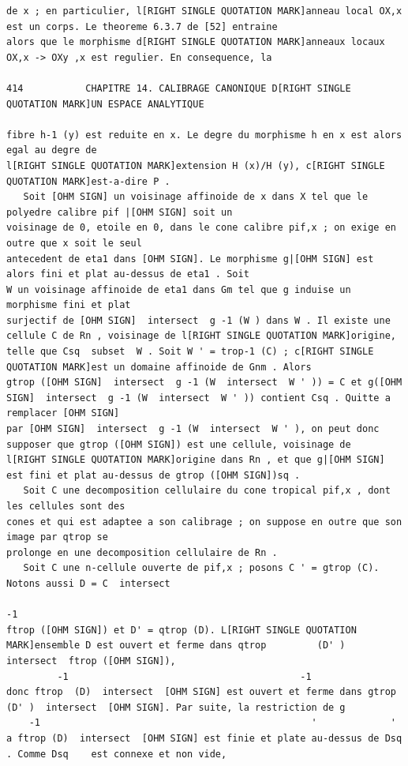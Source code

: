 \documentclass[
  11pt,
]{article}
\begin{document}
\begin{lstlisting}
de x ; en particulier, l[RIGHT SINGLE QUOTATION MARK]anneau local OX,x est un corps. Le theoreme 6.3.7 de [52] entraine
alors que le morphisme d[RIGHT SINGLE QUOTATION MARK]anneaux locaux OX,x -> OXy ,x est regulier. En consequence, la

414           CHAPITRE 14. CALIBRAGE CANONIQUE D[RIGHT SINGLE QUOTATION MARK]UN ESPACE ANALYTIQUE

fibre h-1 (y) est reduite en x. Le degre du morphisme h en x est alors egal au degre de
l[RIGHT SINGLE QUOTATION MARK]extension H (x)/H (y), c[RIGHT SINGLE QUOTATION MARK]est-a-dire P .
   Soit [OHM SIGN] un voisinage affinoide de x dans X tel que le polyedre calibre pif |[OHM SIGN] soit un
voisinage de 0, etoile en 0, dans le cone calibre pif,x ; on exige en outre que x soit le seul
antecedent de eta1 dans [OHM SIGN]. Le morphisme g|[OHM SIGN] est alors fini et plat au-dessus de eta1 . Soit
W un voisinage affinoide de eta1 dans Gm tel que g induise un morphisme fini et plat
surjectif de [OHM SIGN]  intersect  g -1 (W ) dans W . Il existe une cellule C de Rn , voisinage de l[RIGHT SINGLE QUOTATION MARK]origine,
telle que Csq  subset  W . Soit W ' = trop-1 (C) ; c[RIGHT SINGLE QUOTATION MARK]est un domaine affinoide de Gnm . Alors
gtrop ([OHM SIGN]  intersect  g -1 (W  intersect  W ' )) = C et g([OHM SIGN]  intersect  g -1 (W  intersect  W ' )) contient Csq . Quitte a remplacer [OHM SIGN]
par [OHM SIGN]  intersect  g -1 (W  intersect  W ' ), on peut donc supposer que gtrop ([OHM SIGN]) est une cellule, voisinage de
l[RIGHT SINGLE QUOTATION MARK]origine dans Rn , et que g|[OHM SIGN] est fini et plat au-dessus de gtrop ([OHM SIGN])sq .
   Soit C une decomposition cellulaire du cone tropical pif,x , dont les cellules sont des
cones et qui est adaptee a son calibrage ; on suppose en outre que son image par qtrop se
prolonge en une decomposition cellulaire de Rn .
   Soit C une n-cellule ouverte de pif,x ; posons C ' = gtrop (C). Notons aussi D = C  intersect 
                                                                             -1
ftrop ([OHM SIGN]) et D' = qtrop (D). L[RIGHT SINGLE QUOTATION MARK]ensemble D est ouvert et ferme dans qtrop         (D' )  intersect  ftrop ([OHM SIGN]),
         -1                                         -1
donc ftrop  (D)  intersect  [OHM SIGN] est ouvert et ferme dans gtrop      (D' )  intersect  [OHM SIGN]. Par suite, la restriction de g
    -1                                                '             '
a ftrop (D)  intersect  [OHM SIGN] est finie et plate au-dessus de Dsq     . Comme Dsq    est connexe et non vide,

\end{lstlisting}
\end{document}
